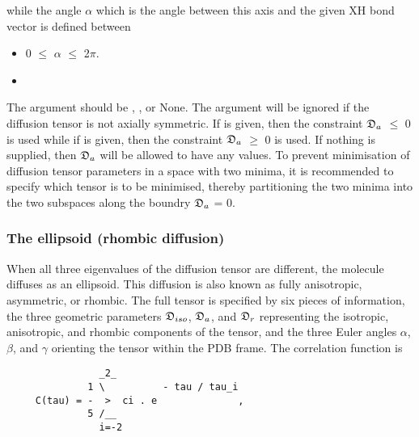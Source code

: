  while the angle $\alpha$ which is the angle between this axis and the given XH bond vector is defined between 
  

 \begin{itemize} 
 \item[] 0 $\le$ $\alpha$ $\le$ 2$\pi$.  
 \item[]  
 \end{itemize} 
  

 The  argument should be , , or None.  The argument will be ignored if the diffusion tensor is not axially symmetric.  If  is given, then the constraint $\mathfrak{D}_a$ $\le$ 0 is used while if  is given, then the constraint $\mathfrak{D}_a$ $\ge$ 0 is used.  If nothing is supplied, then $\mathfrak{D}_a$ will be allowed to have any values.  To prevent minimisation of diffusion tensor parameters in a space with two minima, it is recommended to specify which tensor is to be minimised, thereby partitioning the two minima into the two subspaces along the boundry $\mathfrak{D}_a$ = 0. 
  

  
 \subsubsection{The ellipsoid (rhombic diffusion)} 

 When all three eigenvalues of the diffusion tensor are different, the molecule diffuses as an ellipsoid.  This diffusion is also known as fully anisotropic, asymmetric, or rhombic. The full tensor is specified by six pieces of information, the three geometric parameters $\mathfrak{D}_{iso}$, $\mathfrak{D}_a$, and $\mathfrak{D}_r$ representing the isotropic, anisotropic, and rhombic components of the tensor, and the three Euler angles $\alpha$, $\beta$, and $\gamma$ orienting the tensor within the PDB frame.  The correlation function is 
  

 {\footnotesize \begin{verbatim} 
                _2_ 
              1 \          - tau / tau_i 
     C(tau) = -  >  ci . e              , 
              5 /__ 
                i=-2 
 \end{verbatim}} 

